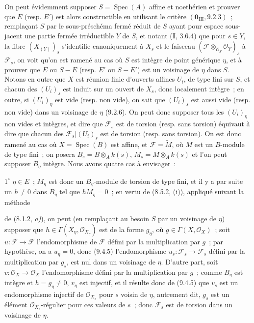 On peut évidemment supposer $S=\operatorname{Spec}(A)$ affine et noethérien et
prouver que $E$ (resp. $E'$) est alors constructible en utilisant le critère
$(\mathbf 0_{\mathrm{III}},9.2.3)$~; remplaçant $S$ par le sous-préschéma fermé
réduit de $S$ ayant pour espace sous-jacent une partie fermée irréductible $Y$
de $S$, et notant (\textbf{I}, 3.6.4) que pour $s\in Y$, la fibre
$(X_{(Y)})_s$ s'identifie canoniquement à $X_s$ et le faisceau
$(\mathcal F\otimes_{\mathcal O_S}\mathcal O_Y)_s$ à $\mathcal F_s$, on voit
qu'on est ramené au cas où $S$ est intègre de point générique $\eta$, et à
prouver que $E$ ou $S-E$ (resp. $E'$ ou $S-E'$) est un voisinage de $\eta$
dans $S$. Notons en outre que $X$ est réunion finie d'ouverts affines $U_i$,
de type fini sur $S$, et chacun des $(U_i)_s$ est induit sur un ouvert de
$X_s$, donc localement intègre~; en outre, si $(U_i)_\eta$ est vide (resp. non
vide), on sait que $(U_i)_s$ est aussi vide (resp. non vide) dans un voisinage
de $\eta$ (9.2.6). On peut donc supposer tous les $(U_i)_\eta$ non vides et
intègres, et dire que $\mathcal F_s$ est de torsion (resp. sans torsion)
équivaut à dire que chacun des $\mathcal F_s|(U_i)_s$ est de torsion (resp.
sans torsion). On est donc ramené au cas où $X=\operatorname{Spec}(B)$ est
affine, et $\mathcal F=\widetilde M$, où $M$ est un $B$-module de type fini~;
on posera $B_s=B\otimes_A k(s)$, $M_s=M\otimes_A k(s)$ et l'on peut supposer
$B_\eta$ intègre. Nous avons quatre cas à envisager~:

$1^\circ$ $\eta\in E$~; $M_\eta$ est donc un $B_\eta$-module de torsion de
type fini, et il y a par suite un $h\neq0$ dans $B_\eta$ tel que
$hM_\eta=0$~; en vertu de (8.5.2, (i)), appliqué suivant la méthode


de (8.1.2, \emph{a)}), on peut (en remplaçant au besoin $S$ par un voisinage
de $\eta$) supposer que $h\in\Gamma(X_\eta,\mathcal O_{X_\eta})$ est de la
forme $g_\eta$, où $g\in\Gamma(X,\mathcal O_X)$~; soit
$u:\mathcal F\to\mathcal F$ l'endomorphisme de $\mathcal F$ défini par la
multiplication par $g$~; par hypothèse, on a $u_\eta=0$, donc (9.4.5)
l'endomorphisme $u_s:\mathcal F_s\to\mathcal F_s$ défini par la multiplication
par $g_s$, est nul dans un voisinage de $\eta$. D'autre part, soit
$v:\mathcal O_X\to\mathcal O_X$ l'endomorphisme défini par la multiplication
par $g$~; comme $B_\eta$ est intègre et $h=g_\eta\neq0$, $v_\eta$ est injectif,
et il résulte donc de (9.4.5) que $v_s$ est un endomorphisme injectif de
$\mathcal O_{X_s}$ pour $s$ voisin de $\eta$, autrement dit, $g_s$ est un
élément $\mathcal O_{X_s}$-régulier pour ces valeurs de $s$~; donc
$\mathcal F_s$ est de torsion dans un voisinage de $\eta$.

